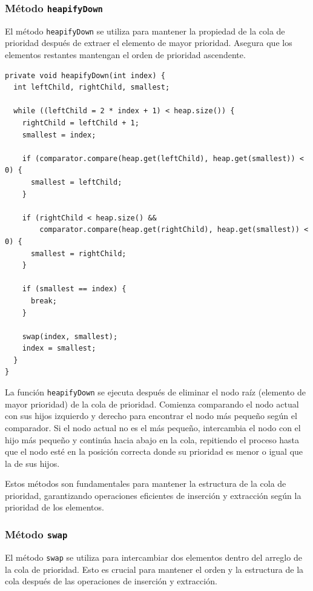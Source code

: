 \documentclass[10pt, a4paper]{article}
\newcommand{\mj}[1]{\texttt{#1}}
\begin{document}
\subsubsection{Método \mj{heapifyDown}}

El método \mj{heapifyDown} se utiliza para mantener la propiedad de la cola de prioridad después de extraer el elemento de mayor prioridad. Asegura que los elementos restantes mantengan el orden de prioridad ascendente.

\begin{verbatim}
private void heapifyDown(int index) {
  int leftChild, rightChild, smallest;

  while ((leftChild = 2 * index + 1) < heap.size()) {
    rightChild = leftChild + 1;
    smallest = index;

    if (comparator.compare(heap.get(leftChild), heap.get(smallest)) < 0) {
      smallest = leftChild;
    }

    if (rightChild < heap.size() &&
        comparator.compare(heap.get(rightChild), heap.get(smallest)) < 0) {
      smallest = rightChild;
    }

    if (smallest == index) {
      break;
    }

    swap(index, smallest);
    index = smallest;
  }
}
\end{verbatim}

La función \mj{heapifyDown} se ejecuta después de eliminar el nodo raíz (elemento de mayor prioridad) de la cola de prioridad. Comienza comparando el nodo actual con sus hijos izquierdo y derecho para encontrar el nodo más pequeño según el comparador. Si el nodo actual no es el más pequeño, intercambia el nodo con el hijo más pequeño y continúa hacia abajo en la cola, repitiendo el proceso hasta que el nodo esté en la posición correcta donde su prioridad es menor o igual que la de sus hijos.

Estos métodos son fundamentales para mantener la estructura de la cola de prioridad, garantizando operaciones eficientes de inserción y extracción según la prioridad de los elementos.

\subsubsection{Método \mj{swap}}

El método \mj{swap} se utiliza para intercambiar dos elementos dentro del arreglo de la cola de prioridad. Esto es crucial para mantener el orden y la estructura de la cola después de las operaciones de inserción y extracción.
\end{document}
